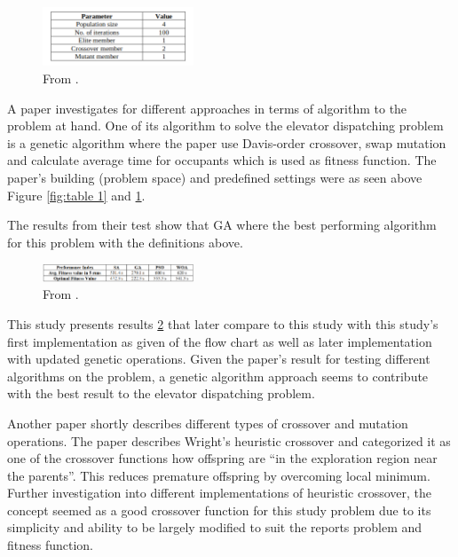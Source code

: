 \begin{figure}[ht]
	\centering
	\includegraphics[width=0.4\textwidth]{figures/samuel.png}
	\caption{From \cite{ahmed2022investigation}.}
	\label{fig:table 2}
\end{figure}

A paper\cite{ahmed2022investigation} investigates for different approaches in terms of algorithm to the problem at hand. One of its algorithm to solve the elevator dispatching problem is a genetic algorithm where the paper use Davis-order crossover, swap mutation and calculate average time for occupants  which is used as fitness function. The paper's building (problem space) and predefined settings were as seen above Figure \ref{fig:table 1} and \ref{fig:table 2}.

The results from their test show that GA where the best performing algorithm for this problem with the definitions above.
\begin{figure}[ht]
	\centering
	\includegraphics[width=0.4\textwidth]{figures/results.png}
	\caption{From \cite{ahmed2022investigation}.}
	\label{fig:results}
\end{figure}

This study presents results \ref{fig:results} that later compare to this study with this study's first implementation as given of the flow chart \cite{tartan2016genetic} as well as later implementation with updated genetic operations. Given the paper's result for testing different algorithms on the problem, a genetic algorithm approach seems to contribute with the best result to the elevator dispatching problem.

Another paper\cite{lim2017crossover} shortly describes different types of crossover and mutation operations. The paper describes Wright's heuristic crossover and categorized it as one of the crossover functions how offspring are “in the exploration region near the parents”\cite{lim2017crossover}. This reduces premature offspring by overcoming local minimum. Further investigation into different implementations of heuristic crossover, the concept seemed as a good crossover function for this study problem due to its simplicity and ability to be largely modified to suit the reports problem and fitness function.


